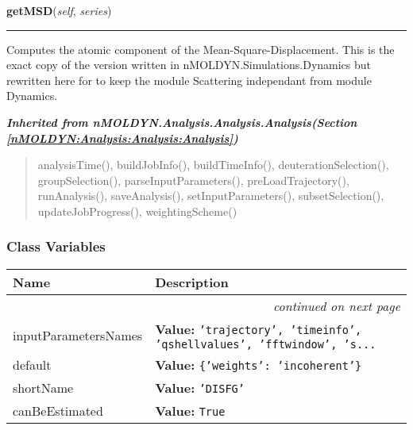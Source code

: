     \vspace{0.5ex}

\hspace{.8\funcindent}\begin{boxedminipage}{\funcwidth}

    \raggedright \textbf{getMSD}(\textit{self}, \textit{series})

    \vspace{-1.5ex}

    \rule{\textwidth}{0.5\fboxrule}
\setlength{\parskip}{2ex}
    Computes the atomic component of the Mean-Square-Displacement. This is 
    the exact copy of the version written in nMOLDYN.Simulations.Dynamics 
    but rewritten here for to keep the module Scattering independant from 
    module Dynamics.

\setlength{\parskip}{1ex}
    \end{boxedminipage}


\large{\textbf{\textit{Inherited from nMOLDYN.Analysis.Analysis.Analysis\textit{(Section \ref{nMOLDYN:Analysis:Analysis:Analysis})}}}}

\begin{quote}
analysisTime(), buildJobInfo(), buildTimeInfo(), deuterationSelection(), groupSelection(), parseInputParameters(), preLoadTrajectory(), runAnalysis(), saveAnalysis(), setInputParameters(), subsetSelection(), updateJobProgress(), weightingScheme()
\end{quote}


  \subsubsection{Class Variables}

    \vspace{-1cm}
\hspace{\varindent}\begin{longtable}{|p{\varnamewidth}|p{\vardescrwidth}|l}
\cline{1-2}
\cline{1-2} \centering \textbf{Name} & \centering \textbf{Description}& \\
\cline{1-2}
\endhead\cline{1-2}\multicolumn{3}{r}{\small\textit{continued on next page}}\\\endfoot\cline{1-2}
\endlastfoot\raggedright i\-n\-p\-u\-t\-P\-a\-r\-a\-m\-e\-t\-e\-r\-s\-N\-a\-m\-e\-s\- & \raggedright \textbf{Value:} 
{\tt 'trajectory', 'timeinfo', 'qshellvalues', 'fftwindow', 's\texttt{...}}&\\
\cline{1-2}
\raggedright d\-e\-f\-a\-u\-l\-t\- & \raggedright \textbf{Value:} 
{\tt \{'weights': 'incoherent'\}}&\\
\cline{1-2}
\raggedright s\-h\-o\-r\-t\-N\-a\-m\-e\- & \raggedright \textbf{Value:} 
{\tt 'DISFG'}&\\
\cline{1-2}
\raggedright c\-a\-n\-B\-e\-E\-s\-t\-i\-m\-a\-t\-e\-d\- & \raggedright \textbf{Value:} 
{\tt True}&\\
\cline{1-2}
\end{longtable}

